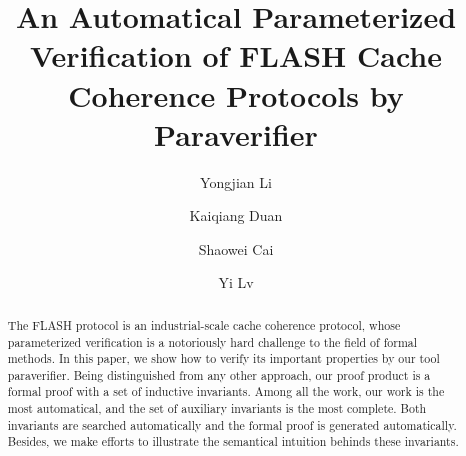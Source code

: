 \documentclass{llncs}
\begin{document}
\title{  An Automatical Parameterized Verification of  FLASH Cache Coherence Protocols by Paraverifier}
\author{Yongjian Li  \and
        Kaiqiang Duan  \and
        Shaowei Cai  \and
        Yi Lv  }

\maketitle

\begin{abstract}
The FLASH protocol is an industrial-scale cache coherence protocol, whose parameterized verification is a notoriously hard challenge to the field of formal methods. In this paper, we show how to verify its important properties by our tool {\sf paraverifier}. Being distinguished from any other approach, our proof product is a formal  proof with a set of inductive invariants. %
Among all the work, our work is the most automatical, and the  set of auxiliary invariants is the most complete. Both invariants are searched automatically and the formal proof is generated automatically. Besides, we make efforts to illustrate the semantical intuition behinds these invariants.

\end{abstract}

\end{document}

